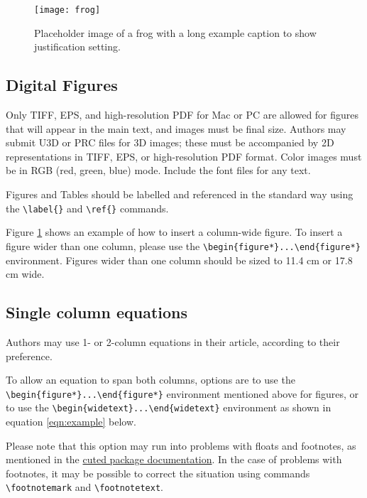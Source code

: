 \documentclass[9pt,twocolumn,twoside,lineno]{pnas-new}
\begin{document}
\begin{figure}%
\centering
\texttt{[image: frog]}
\caption{Placeholder image of a frog with a long example caption to show justification setting.}
\label{fig:frog}
\end{figure}

\subsection*{Digital Figures}
\label{sec:figures}

Only TIFF, EPS, and high-resolution PDF for Mac or PC are allowed for figures that will appear in the main text, and images must be final size. Authors may submit U3D or PRC files for 3D images; these must be accompanied by 2D representations in TIFF, EPS, or high-resolution PDF format.  Color images must be in RGB (red, green, blue) mode. Include the font files for any text. 

Figures and Tables should be labelled and referenced in the standard way using the \verb|\label{}| and \verb|\ref{}| commands.

Figure \ref{fig:frog} shows an example of how to insert a column-wide figure. To insert a figure wider than one column, please use the \verb|\begin{figure*}...\end{figure*}| environment. Figures wider than one column should be sized to 11.4 cm or 17.8 cm wide.

\subsection*{Single column equations}

Authors may use 1- or 2-column equations in their article, according to their preference.

To allow an equation to span both columns, options are to use the \verb|\begin{figure*}...\end{figure*}| environment mentioned above for figures, or to use the \verb|\begin{widetext}...\end{widetext}| environment as shown in equation \ref{eqn:example} below.

Please note that this option may run into problems with floats and footnotes, as mentioned in the \href{http://texdoc.net/pkg/cuted}{cuted package documentation}. In the case of problems with footnotes, it may be possible to correct the situation using commands \verb|\footnotemark| and \verb|\footnotetext|.
\end{document}
